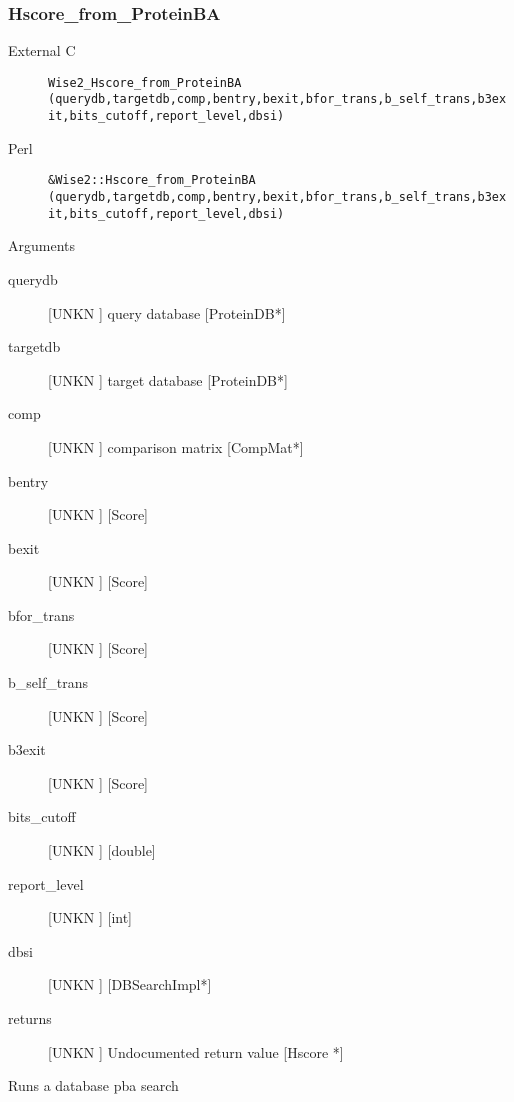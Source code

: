 \subsubsection{Hscore_from_ProteinBA}
\begin{description}
\item[External C] {\tt Wise2_Hscore_from_ProteinBA (querydb,targetdb,comp,bentry,bexit,bfor_trans,b_self_trans,b3exit,bits_cutoff,report_level,dbsi)}
\item[Perl] {\tt &Wise2::Hscore_from_ProteinBA (querydb,targetdb,comp,bentry,bexit,bfor_trans,b_self_trans,b3exit,bits_cutoff,report_level,dbsi)}

\end{description}
Arguments
\begin{description}
\item[querydb] [UNKN ] query database [ProteinDB*]
\item[targetdb] [UNKN ] target database [ProteinDB*]
\item[comp] [UNKN ] comparison matrix [CompMat*]
\item[bentry] [UNKN ]  [Score]
\item[bexit] [UNKN ]  [Score]
\item[bfor_trans] [UNKN ]  [Score]
\item[b_self_trans] [UNKN ]  [Score]
\item[b3exit] [UNKN ]  [Score]
\item[bits_cutoff] [UNKN ]  [double]
\item[report_level] [UNKN ]  [int]
\item[dbsi] [UNKN ]  [DBSearchImpl*]
\item[returns] [UNKN ] Undocumented return value [Hscore *]
\end{description}
Runs a database pba search




